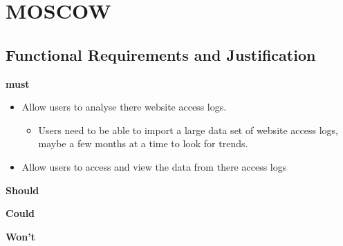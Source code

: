 
\section{MOSCOW}
\subsection{Functional Requirements and Justification}
\textbf{must}
\begin{itemize}
    \item Allow users to analyse there website access logs.
    \begin{itemize}
        \item Users need to be able to import a large data set of website access logs, maybe a few months at a time to look for trends.
    \end{itemize}
    \item Allow users to access and view the data from there access logs
\end{itemize}
\textbf{Should}

\textbf{Could}

\textbf{Won't}